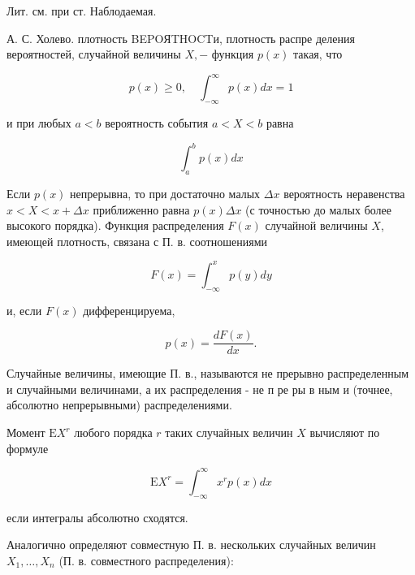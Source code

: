 \documentclass[10pt]{article}
\begin{document}
Лит. см. при ст. Наблодаемая.



А. С. Холево. плотность BEPOЯTHOCTи, плотность распре деления вероятностей, случайной величины $X,-$ функция $p(x)$ такая, что



\[

p(x) \geqslant 0, \quad \int_{-\infty}^{\infty} p(x) d x=1

\]



и при любых $a<b$ вероятность события $a<X<b$ равна



\[

\int_{a}^{b} p(x) d x

\]



Если $p(x)$ непрерывна, то при достаточно малых $\Delta x$ вероятность неравенства $x<X<x+\Delta x$ приближенно равна $p(x) \Delta x$ (с точностью до малых более высокого порядка). Функция распределения $F(x)$ случайной величины $X$, имеющей плотность, связана с П. в. соотношениями



\[

F(x)=\int_{-\infty}^{x} p(y) d y

\]



и, если $F(x)$ дифференцируема,



\[

p(x)=\frac{d F(x)}{d x} .

\]



Случайные величины, имеющие П. в., называются не прерывно распределенным и случайными величинами, а их распределения - не п ре ры в ным и (точнее, абсолютно непрерывными) распределениями.



Момент $\mathrm{E} X^{r}$ любого порядка $r$ таких случайных величин $X$ вычисляют по формуле



\[

\mathrm{E} X^{r}=\int_{-\infty}^{\infty} x^{r} p(x) d x

\]



если интегралы абсолютно сходятся.



Аналогично определяют совместную П. в. нескольких случайных величин $X_{1}, \ldots, X_{n}$ (П. в. совместного распределения):
\end{document}
